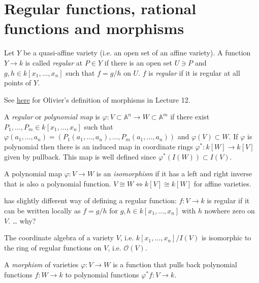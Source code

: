 \section{Regular functions, rational functions and morphisms}
\label{section-regular-functions}

\begin{definition}
\label{definition-regular-function}
Let $Y$ be a quasi-affine variety
(i.e. an open set of an affine variety).
A function $Y \to k$ is called {\it regular} at $P \in Y$
if there is an open set $U \ni P$ and
$g,h \in k[x_1,…,x_n]$ such that
$f=g/h$ on $U$. $f$ is {\it regular} if it is regular
at all points of $Y$.
\end{definition}


\noindent
See \href{https://www.youtube.com/live/Vh32DbT0JwA?si=EUXKOcCx5R6xQITt&t=4447}{
here} for Olivier's definition of morphisms in Lecture 12.

\medskip\noindent
A {\it regular} or {\it polynomial map} 
is $\varphi:V \subset \mathbb{A}^n \to W \subset \mathbb{A}^m$
if there exist $P_1,…,P_m \in k[x_1,…,x_n]$ such that
$\varphi(a_1,…,a_n)=(P_1(a_1,…,a_n),…,P_m(a_1,…,a_n))$
and $\varphi(V) \subset W$.
If $\varphi$ is polynomial then there is an induced
map in coordinate rings
$\varphi^*:k[W] \to k[V]$ given by pullback.
This map is well defined since $\varphi^*(I(W))\subset I(V)$.

A polynomial map $\varphi:V \to W$ is an {\it isomorphism} 
if it has a left and right inverse that is also a polynomial function.
$V \cong W \iff k[V] \cong k[W]$ for affine varieties.

\begin{remark}
\label{remark-hartshorne-definition}
\cite{hart} has slightly different way of defining a regular function:
$f:V \to k$ is regular if it can be written locally
as $f=g/h$ for $g,h \in k[x_1,…,x_n]$ with $h$ nowhere zero on $V$.
… why?
\end{remark}

\begin{proposition}
\label{proposition-coordinate-algebra}
The coordinate algebra of a variety $V$,
i.e. $k[x_1,…,x_n]/I(V)$ is isomorphic to
the ring of regular functions on $V$, i.e. $\mathcal{O}(V)$.
\end{proposition}

\begin{definition}
\label{definition-morphism}
A {\it morphism} of varieties $\varphi:V \to W$
is a function that pulls back polynomial functions
$f:W \to k$ to polynomial functions $\varphi^*f:V \to k$.
\end{definition}


